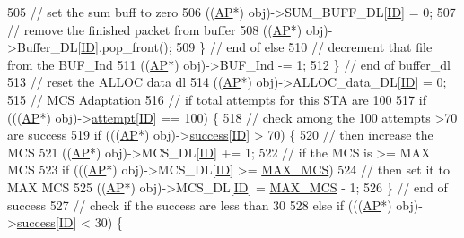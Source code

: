 \begin{DoxyCode}
505                     \textcolor{comment}{// set the sum buff to zero}
506                     ((\hyperlink{classAP}{AP}*) obj)->SUM\_BUFF\_DL[\hyperlink{classSTA_a9376abb50969b5b16aeb5fb0e449e6f7}{ID}] = 0;
507                     \textcolor{comment}{// remove the finished packet from buffer}
508                     ((\hyperlink{classAP}{AP}*) obj)->Buffer\_DL[\hyperlink{classSTA_a9376abb50969b5b16aeb5fb0e449e6f7}{ID}].pop\_front();
509                 \} \textcolor{comment}{// end of else}
510                   \textcolor{comment}{// decrement that file from the BUF\_Ind   }
511                 ((\hyperlink{classAP}{AP}*) obj)->BUF\_Ind -= 1;
512             \} \textcolor{comment}{// end of buffer\_dl}
513               \textcolor{comment}{// reset the ALLOC data dl}
514             ((\hyperlink{classAP}{AP}*) obj)->ALLOC\_data\_DL[\hyperlink{classSTA_a9376abb50969b5b16aeb5fb0e449e6f7}{ID}] = 0;
515             \textcolor{comment}{// MCS Adaptation}
516             \textcolor{comment}{// if total attempts for this STA are 100   }
517             \textcolor{keywordflow}{if} (((\hyperlink{classAP}{AP}*) obj)->\hyperlink{classSTA_a4cfeac60ce7a13a4bbae68b756655dc9}{attempt}[\hyperlink{classSTA_a9376abb50969b5b16aeb5fb0e449e6f7}{ID}] == 100) \{
518                 \textcolor{comment}{// check among the 100 attempts >70 are success}
519                 \textcolor{keywordflow}{if} (((\hyperlink{classAP}{AP}*) obj)->\hyperlink{classSTA_a8f2d6be8326b3e46fbf1599040bff750}{success}[\hyperlink{classSTA_a9376abb50969b5b16aeb5fb0e449e6f7}{ID}] > 70) \{
520                     \textcolor{comment}{// then increase the MCS}
521                     ((\hyperlink{classAP}{AP}*) obj)->MCS\_DL[\hyperlink{classSTA_a9376abb50969b5b16aeb5fb0e449e6f7}{ID}] += 1;
522                     \textcolor{comment}{// if the MCS is >= MAX MCS}
523                     \textcolor{keywordflow}{if} (((\hyperlink{classAP}{AP}*) obj)->MCS\_DL[\hyperlink{classSTA_a9376abb50969b5b16aeb5fb0e449e6f7}{ID}] >= \hyperlink{classSTA_a5c5df3db89aa13fc409c4c0d6f8924d2}{MAX\_MCS})
524                         \textcolor{comment}{// then set it to MAX MCS}
525                         ((\hyperlink{classAP}{AP}*) obj)->MCS\_DL[\hyperlink{classSTA_a9376abb50969b5b16aeb5fb0e449e6f7}{ID}] = \hyperlink{classSTA_a5c5df3db89aa13fc409c4c0d6f8924d2}{MAX\_MCS} - 1;
526                 \} \textcolor{comment}{// end of success}
527                   \textcolor{comment}{// check if the success are less than 30%
528                 \textcolor{keywordflow}{else} \textcolor{keywordflow}{if} (((\hyperlink{classAP}{AP}*) obj)->\hyperlink{classSTA_a8f2d6be8326b3e46fbf1599040bff750}{success}[\hyperlink{classSTA_a9376abb50969b5b16aeb5fb0e449e6f7}{ID}] < 30) \{
}
\end{DoxyCode}
